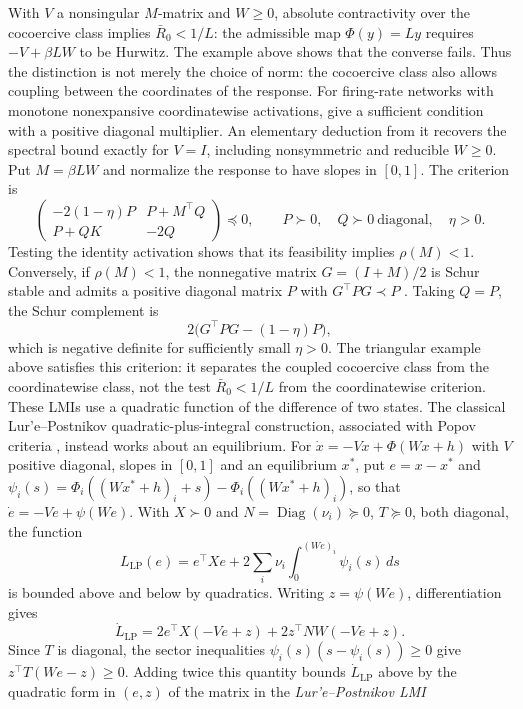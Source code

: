 With $V$ a nonsingular $M$-matrix and $W\ge0$, absolute contractivity over the cocoercive class
implies $\bar R_0<1/L$: the admissible map $\Phi(y)=Ly$ requires $-V+\beta LW$ to be Hurwitz. The
example above shows that the converse fails. Thus the distinction is not merely the choice of
norm: the cocoercive class also allows coupling between the coordinates of the response.
For firing-rate networks with monotone nonexpansive coordinatewise activations,
\cite{Gokhale2026} give a sufficient condition with a positive diagonal multiplier. An elementary
deduction from it recovers the spectral bound exactly for $V=I$, including nonsymmetric and
reducible $W\ge0$. Put $M=\beta LW$ and normalize the response to have slopes in $[0,1]$. The
criterion is
\[
 \begin{pmatrix}
 -2(1-\eta)P & P+M^\top Q\\
 P+QK & -2Q
 \end{pmatrix}\preceq0,
 \qquad P\succ0,\quad Q\succ0\ \text{diagonal},\quad\eta>0.
\]
Testing the identity activation shows that its feasibility implies $\rho(M)<1$. Conversely, if
$\rho(M)<1$, the nonnegative matrix $G=(I+M)/2$ is Schur stable and admits a positive diagonal
matrix $P$ with $G^\top PG\prec P$ \cite{rantzer2015scalable}. Taking $Q=P$, the Schur complement is
\[
 2\bigl(G^\top PG-(1-\eta)P\bigr),
\]
which is negative definite for sufficiently small $\eta>0$. The triangular example above satisfies
this criterion: it separates the coupled cocoercive class from the coordinatewise class, not
the test $\bar R_0<1/L$ from the coordinatewise criterion.
These LMIs use a quadratic function of the difference of two states. The classical
Lur'e--Postnikov quadratic-plus-integral construction, associated with Popov criteria
\cite{Khalil2002}, instead works about an equilibrium. For $\dot x=-Vx+\Phi(Wx+h)$ with $V$ positive
diagonal, slopes in $[0,1]$ and an equilibrium $x^*$, put $e=x-x^*$ and
$\psi_i(s)=\Phi_i((Wx^*+h)_i+s)-\Phi_i((Wx^*+h)_i)$, so that $\dot e=-Ve+\psi(We)$. With $X\succ0$
and $N=\operatorname{Diag}(\nu_i)\succeq0$, $T\succeq0$, both diagonal, the function
\[
 L_{\mathrm{LP}}(e)=e^\top Xe+2\sum_i\nu_i\int_0^{(We)_i}\psi_i(s)\,ds
\]
is bounded above and below by quadratics. Writing $z=\psi(We)$, differentiation gives
\[
 \dot L_{\mathrm{LP}}=2e^\top X(-Ve+z)+2z^\top NW(-Ve+z).
\]
Since $T$ is diagonal, the sector inequalities $\psi_i(s)(s-\psi_i(s))\ge0$ give
$z^\top T(We-z)\ge0$. Adding twice this quantity bounds $\dot L_{\mathrm{LP}}$ above by the quadratic
form in $(e,z)$ of the matrix in the \emph{Lur'e--Postnikov LMI}
